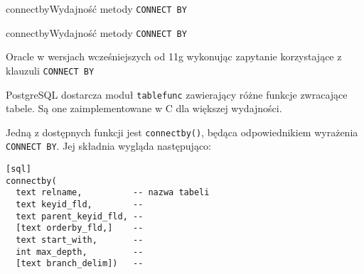 


\begin{qxtab}{connectby}{Wydajność metody \texttt{CONNECT BY}}
\end{qxtab}

\begin{qxfig}{connectby}{Wydajność metody \texttt{CONNECT BY}}
\end{qxfig}


Oracle w wersjach wcześniejszych od 11g wykonując zapytanie korzystające z klauzuli \texttt{CONNECT BY}





PostgreSQL dostarcza moduł \texttt{tablefunc} zawierający różne funkcje zwracające tabele.
Są one zaimplementowane w C dla większej wydajności.

Jedną z dostępnych funkcji jest \texttt{connectby()}, będąca odpowiednikiem wyrażenia \texttt{CONNECT BY}. Jej składnia wygląda następująco:

\begin{verbatim}[sql]
connectby(
  text relname,          -- nazwa tabeli
  text keyid_fld,        -- 
  text parent_keyid_fld, -- 
  [text orderby_fld,]    -- 
  text start_with,       -- 
  int max_depth,         -- 
  [text branch_delim])   -- 
\end{verbatim}











